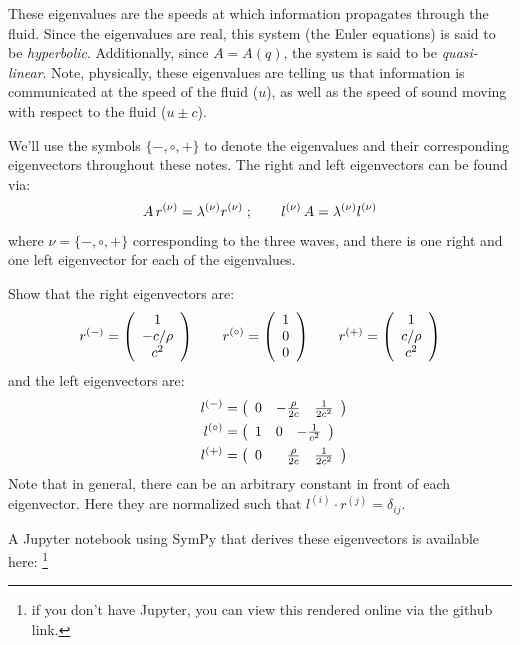 These eigenvalues are the speeds at which information propagates
through the fluid.  Since the eigenvalues are real, this system (the
Euler equations) is said to be {\em hyperbolic}.  Additionally, since
$A = A(q)$, the system is said to be {\em quasi-linear}.  Note,
physically, these eigenvalues are telling us that information is
communicated at the speed of the fluid ($u$), as well as the speed of
sound moving with respect to the fluid ($u \pm c$).

We'll use the symbols $\{-,\circ,+\}$ to denote the eigenvalues and their
corresponding eigenvectors throughout these notes.
%
The right and left eigenvectors can be found via:
\begin{equation}
A \, r^{(\nu)} = \lambda^{(\nu)} r^{(\nu)} \; ;
\qquad
l^{(\nu)} \, A  = \lambda^{(\nu)} l^{(\nu)}
\end{equation}
where $\nu = \{-,\circ,+\}$ corresponding to the three waves, and
there is one right and one left eigenvector for each of the eigenvalues.
%
\begin{exercise}
{
Show that the right eigenvectors are:
\begin{equation}
\label{eq:euler:primRevs}
r^\evm = \left ( \begin{array}{c} 1 \\ -c/\rho \\ c^2 \end{array} \right )
%
\qquad
r^\evz = \left ( \begin{array}{c} 1 \\ 0 \\ 0  \end{array} \right )
%
\qquad
r^\evp = \left ( \begin{array}{c} 1 \\ c/\rho \\ c^2 \end{array} \right )
\end{equation}
and the left eigenvectors are:
\begin{align}
l^\evm &= \left ( \begin{array}{ccc} 0 & -\frac{\rho}{2c} & \frac{1}{2c^2}
                  \end{array} \right ) \\
%
\qquad
l^\evz &= \left ( \begin{array}{ccc} 1 & 0 & -\frac{1}{c^2}  \end{array} \right ) \\
%
\qquad
l^\evp &= \left ( \begin{array}{ccc} 0 & \phantom{+}\frac{\rho}{2c} & \frac{1}{2c^2} \end{array} \right )
\end{align}
Note that in general, there can be an arbitrary constant in front of each
eigenvector.  Here they are normalized such that
$l^{(i)} \cdot r^{(j)} = \delta_{ij}$.
}
\end{exercise}
A {\sf Jupyter} notebook using {\sf SymPy} that derives these
eigenvectors is available here:
\footnote{if you don't have {\sf Jupyter}, you can view this rendered online via the github link.}

